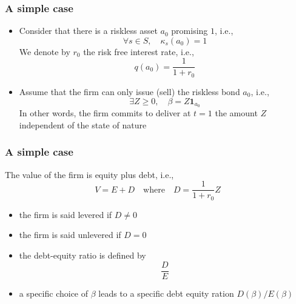 \documentclass[blue]{beamer}
\def\1{\mathbf{1}}
\def\geq{\geqslant}
\theoremstyle{definition}
\theoremstyle{example}
\begin{document}

\begin{frame}\frametitle{A simple case}

\begin{itemize}
\item Consider that there is a riskless asset $a_0$ promising $1$, i.e.,
\[
\forall s\in S, \quad \kappa_s(a_0) =1
\]
We denote by $r_0$ the risk free interest rate, i.e.,
\[
q(a_0) = \frac{1}{1+r_0}
\]
\item Assume that the firm can only issue (sell) the riskless bond $a_0$, i.e.,
\[
\exists Z \geq 0, \quad \beta = Z \1_{a_0}
\]
In other words, the firm commits to deliver at $t=1$ the amount $Z$ independent of the state of nature
\end{itemize}

\end{frame}


\begin{frame}\frametitle{A simple case}

 The value of the firm is equity plus debt, i.e.,
\[
V = E + D \quad \textrm{where} \quad D = \frac{1}{1+r_0} Z
\]
\begin{itemize}
\item the firm is said levered if $D \neq 0$
\item the firm is said unlevered if $D =0$
\item the debt-equity ratio is defined by
\[
\frac{D}{E}
\]
\item a specific choice of $\beta$ leads to a specific debt equity ration $D(\beta)/E(\beta)$
\end{itemize}

\end{frame}

\end{document}
